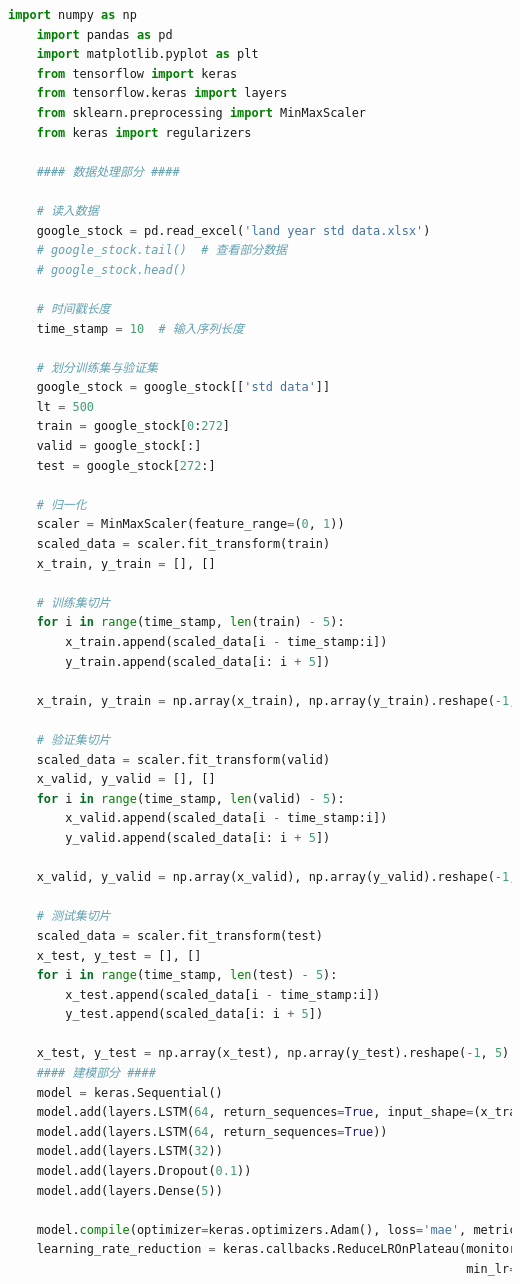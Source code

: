 \documentclass{apmcmthesis}
\begin{document}
  \begin{lstlisting}[language=python, caption={The python source code of LSTM}]
    import numpy as np
    import pandas as pd
    import matplotlib.pyplot as plt
    from tensorflow import keras
    from tensorflow.keras import layers
    from sklearn.preprocessing import MinMaxScaler
    from keras import regularizers
    
    #### 数据处理部分 ####
    
    # 读入数据
    google_stock = pd.read_excel('land year std data.xlsx')
    # google_stock.tail()  # 查看部分数据
    # google_stock.head()
    
    # 时间戳长度
    time_stamp = 10  # 输入序列长度
    
    # 划分训练集与验证集
    google_stock = google_stock[['std data']]
    lt = 500
    train = google_stock[0:272]
    valid = google_stock[:]
    test = google_stock[272:]
    
    # 归一化
    scaler = MinMaxScaler(feature_range=(0, 1))
    scaled_data = scaler.fit_transform(train)
    x_train, y_train = [], []
    
    # 训练集切片
    for i in range(time_stamp, len(train) - 5):
        x_train.append(scaled_data[i - time_stamp:i])
        y_train.append(scaled_data[i: i + 5])
    
    x_train, y_train = np.array(x_train), np.array(y_train).reshape(-1, 5)
    
    # 验证集切片
    scaled_data = scaler.fit_transform(valid)
    x_valid, y_valid = [], []
    for i in range(time_stamp, len(valid) - 5):
        x_valid.append(scaled_data[i - time_stamp:i])
        y_valid.append(scaled_data[i: i + 5])
    
    x_valid, y_valid = np.array(x_valid), np.array(y_valid).reshape(-1, 5)
    
    # 测试集切片
    scaled_data = scaler.fit_transform(test)
    x_test, y_test = [], []
    for i in range(time_stamp, len(test) - 5):
        x_test.append(scaled_data[i - time_stamp:i])
        y_test.append(scaled_data[i: i + 5])
    
    x_test, y_test = np.array(x_test), np.array(y_test).reshape(-1, 5)
    #### 建模部分 ####
    model = keras.Sequential()
    model.add(layers.LSTM(64, return_sequences=True, input_shape=(x_train.shape[1:])))
    model.add(layers.LSTM(64, return_sequences=True))
    model.add(layers.LSTM(32))
    model.add(layers.Dropout(0.1))
    model.add(layers.Dense(5))
    
    model.compile(optimizer=keras.optimizers.Adam(), loss='mae', metrics=['accuracy'])
    learning_rate_reduction = keras.callbacks.ReduceLROnPlateau(monitor='val_loss', patience=3, factor=0.7,
                                                                min_lr=0.000000005)
    

\end{lstlisting}
\end{document}
